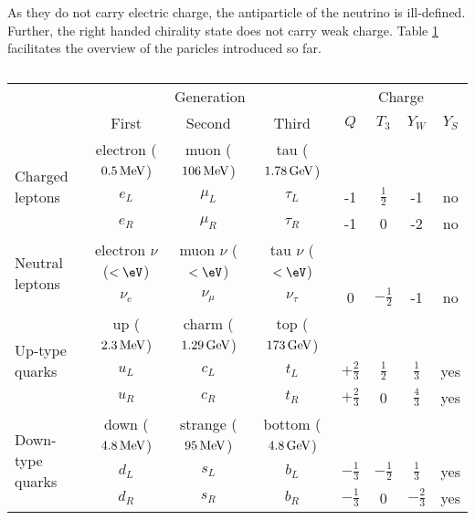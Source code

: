 As they do not carry electric charge, the antiparticle of the neutrino is ill-defined. 
Further, the right handed chirality state does not carry weak charge. 
Table \ref{tab:fermions} facilitates the overview of the paricles introduced so far.
\begin{table}[ht!]
\def\arraystretch{1.2}
\setlength{\belowcaptionskip}{6pt}
\small
\centering
\caption{}
\label{tab:fermions}
\begin{tabular}{l c c c c c c c}
        \hline \hline
        & \multicolumn{3}{c}{Generation} &\multicolumn{4}{c}{Charge} \\
        & First & Second & Third & $Q$ & $T_{3}$ & $Y_{W}$ & $Y_{S}$ \\\hline
\multirow{3}{*}{Charged leptons}& electron ($0.5\,\text{Me\hspace{-.08em}V}$) & muon ($106\,\text{Me\hspace{-.08em}V}$) & tau ($1.78\,\text{Ge\hspace{-.08em}V}$)&  & & & \\
                        & $e_{L}$ & $\mu_{L}$ & $\tau_{L}$ & -1 & $\frac{1}{2}$ & -1 & no\\
                        & $e_{R}$ & $\mu_{R}$ & $\tau_{R}$ & -1 & 0             & -2 & no\\\hline
\multirow{2}{*}{Neutral leptons}& electron $\nu$ ($<\eV$)& muon $\nu$ ($<\eV$)& tau $\nu$ ($<\eV$)&  & & & \\
                        & $\nu_{e}$ & $\nu_{\mu}$ & $\nu_{\tau}$ & 0 & $-\frac{1}{2}$ & -1 & no\\\hline
\multirow{3}{*}{Up-type quarks} & up ($2.3\,\text{Me\hspace{-.08em}V}$)& charm ($1.29\,\text{Ge\hspace{-.08em}V}$)& top ($173\,\text{Ge\hspace{-.08em}V}$)&  & & & \\
                        & $u_{L}$ & $c_{L}$ & $t_{L}$ & $+\frac{2}{3}$ & $\frac{1}{2}$ & $\frac{1}{3}$ & yes\\
                        & $u_{R}$ & $c_{R}$ & $t_{R}$ & $+\frac{2}{3}$ & 0 & $\frac{4}{3}$ & yes\\\hline
\multirow{3}{*}{Down-type quarks} & down ($4.8\,\text{Me\hspace{-.08em}V}$)& strange ($95\,\text{Me\hspace{-.08em}V}$)& bottom ($4.8\,\text{Ge\hspace{-.08em}V}$)&  & & & \\
                        & $d_{L}$ & $s_{L}$ & $b_{L}$ & $-\frac{1}{3}$ & $-\frac{1}{2}$ & $\frac{1}{3}$ & yes\\
                        & $d_{R}$ & $s_{R}$ & $b_{R}$ & $-\frac{1}{3}$ & 0 & $-\frac{2}{3}$ & yes\\\hline
\hline
\end{tabular}
\end{table}                                                                                                              
